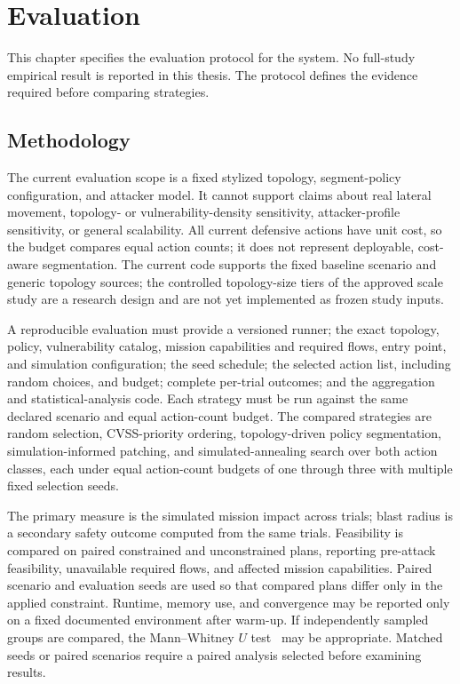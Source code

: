 \chapter{Evaluation}
\label{ch:evaluation}

This chapter specifies the evaluation protocol for the system. No full-study empirical result is reported in this thesis. The protocol defines the evidence required before comparing strategies.

\section{Methodology}

The current evaluation scope is a fixed stylized topology, segment-policy configuration, and attacker model. It cannot support claims about real lateral movement, topology- or vulnerability-density sensitivity, attacker-profile sensitivity, or general scalability. All current defensive actions have unit cost, so the budget compares equal action counts; it does not represent deployable, cost-aware segmentation. The current code supports the fixed baseline scenario and generic topology sources; the controlled topology-size tiers of the approved scale study are a research design and are not yet implemented as frozen study inputs.

A reproducible evaluation must provide a versioned runner; the exact topology, policy, vulnerability catalog, mission capabilities and required flows, entry point, and simulation configuration; the seed schedule; the selected action list, including random choices, and budget; complete per-trial outcomes; and the aggregation and statistical-analysis code. Each strategy must be run against the same declared scenario and equal action-count budget. The compared strategies are random selection, CVSS-priority ordering, topology-driven policy segmentation, simulation-informed patching, and simulated-annealing search over both action classes, each under equal action-count budgets of one through three with multiple fixed selection seeds.

The primary measure is the simulated mission impact across trials; blast radius is a secondary safety outcome computed from the same trials. Feasibility is compared on paired constrained and unconstrained plans, reporting pre-attack feasibility, unavailable required flows, and affected mission capabilities. Paired scenario and evaluation seeds are used so that compared plans differ only in the applied constraint. Runtime, memory use, and convergence may be reported only on a fixed documented environment after warm-up. If independently sampled groups are compared, the Mann--Whitney $U$ test~\cite{mann47} may be appropriate. Matched seeds or paired scenarios require a paired analysis selected before examining results.

